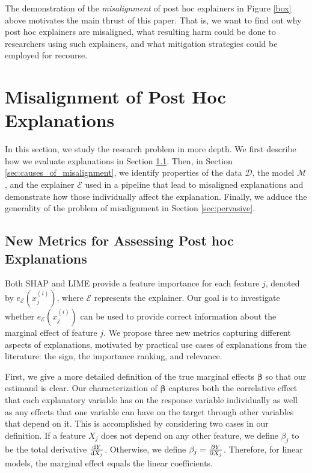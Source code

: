 \documentclass[mnsc,blindrev]{informs3}
\newcommand{\mD}{\mathcal{D}}
\newcommand{\mM}{\mathcal{M}}
\newcommand{\mE}{\mathcal{E}}
\begin{document}
The demonstration of the \textit{misalignment} %
of post hoc explainers in Figure \ref{box} above motivates the main thrust of this paper. That is, we want to find out why post hoc explainers are misaligned, what resulting harm could be done to researchers using such explainers, and what mitigation strategies could be employed for recourse. 


\section{Misalignment of Post Hoc Explanations}
\label{sec:misalignment}
  In this section, we study the research problem in more depth. We first describe how we evaluate explanations in Section \ref{sec:evaluating_faithfulness}. 
  Then, in Section \ref{sec:causes_of_misalignment}, we identify properties of the data $\mD$, the model $\mM$, and the explainer $\mE$ used in a pipeline that lead to misaligned explanations and demonstrate how those individually affect the explanation. Finally, we adduce the generality of the problem of misalignment in Section \ref{sec:pervasive}. %

\subsection{New Metrics for Assessing Post hoc Explanations}
   \label{sec:evaluating_faithfulness}
  Both SHAP and LIME provide a feature importance for each feature $j$, denoted by $e_\mE(x^{(i)}_j)$, where $\mE$ represents the explainer. 
   Our goal is to investigate whether $e_\mE(x^{(i)}_j)$ can be used to provide correct information about the marginal effect of feature $j$. We propose three new metrics capturing  different aspects of explanations,  motivated by practical use cases of explanations from the literature: the sign, the importance ranking, and relevance. 
     
     First, we give a more detailed definition of the true marginal effects $\boldsymbol{\beta}$ so that our estimand is clear. Our characterization of $\boldsymbol{\beta}$ captures both the correlative effect that each explanatory variable has on the response variable individually as well as any effects that one variable can have on the target through other variables that depend on it. This is accomplished by considering two cases in our definition. If a feature $X_j$ does not depend on any other feature, we define $\beta_j$ to be the total derivative $\dv{Y}{X_j}$. Otherwise, we define $\beta_j = \pdv{Y}{X_j}$. Therefore, for linear models, the marginal effect equals the linear coefficients.
\end{document}
